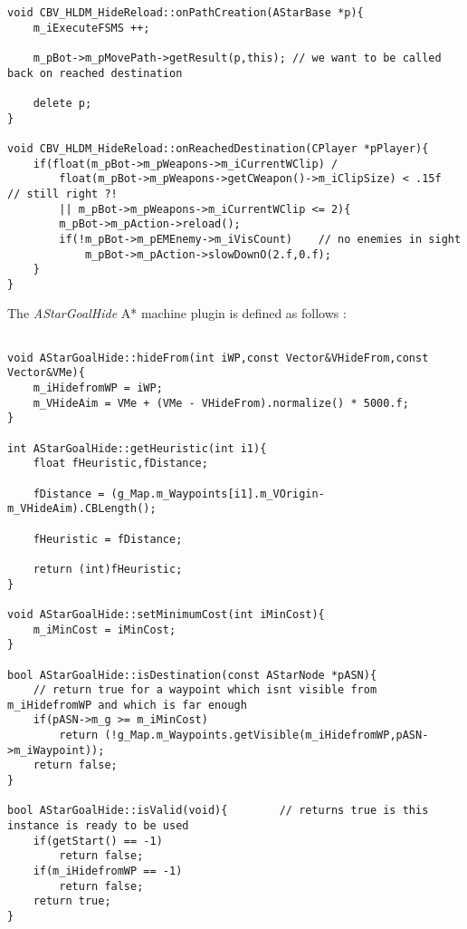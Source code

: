 \documentclass[12pt]{article}
\begin{document}
\begin{verbatim}
void CBV_HLDM_HideReload::onPathCreation(AStarBase *p){
    m_iExecuteFSMS ++;

    m_pBot->m_pMovePath->getResult(p,this);	// we want to be called back on reached destination

    delete p;
}

void CBV_HLDM_HideReload::onReachedDestination(CPlayer *pPlayer){
    if(float(m_pBot->m_pWeapons->m_iCurrentWClip) /
        float(m_pBot->m_pWeapons->getCWeapon()->m_iClipSize) < .15f        // still right ?!
        || m_pBot->m_pWeapons->m_iCurrentWClip <= 2){
        m_pBot->m_pAction->reload();
        if(!m_pBot->m_pEMEnemy->m_iVisCount)	// no enemies in sight
            m_pBot->m_pAction->slowDownO(2.f,0.f);
    }
}

\end{verbatim}
\linespread{1.3}
\normalsize

The \textit{AStarGoalHide} A* machine plugin is defined as follows :

\scriptsize
\linespread{1.0}
\begin{verbatim}

void AStarGoalHide::hideFrom(int iWP,const Vector&VHideFrom,const Vector&VMe){
    m_iHidefromWP = iWP;
    m_VHideAim = VMe + (VMe - VHideFrom).normalize() * 5000.f;
}

int AStarGoalHide::getHeuristic(int i1){
    float fHeuristic,fDistance;

    fDistance = (g_Map.m_Waypoints[i1].m_VOrigin-m_VHideAim).CBLength();

    fHeuristic = fDistance;

    return (int)fHeuristic;
}

void AStarGoalHide::setMinimumCost(int iMinCost){
    m_iMinCost = iMinCost;
}

bool AStarGoalHide::isDestination(const AStarNode *pASN){
    // return true for a waypoint which isnt visible from m_iHidefromWP and which is far enough
    if(pASN->m_g >= m_iMinCost)
        return (!g_Map.m_Waypoints.getVisible(m_iHidefromWP,pASN->m_iWaypoint));
    return false;
}

bool AStarGoalHide::isValid(void){        // returns true is this instance is ready to be used
    if(getStart() == -1)
        return false;
    if(m_iHidefromWP == -1)
        return false;
    return true;
}

\end{verbatim}
\linespread{1.3}
\normalsize
\end{document}
